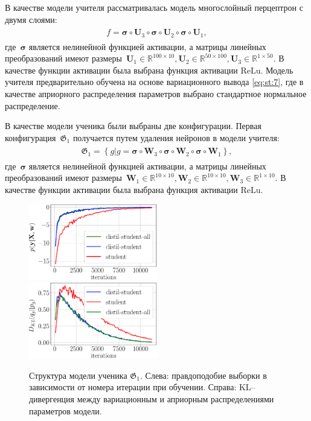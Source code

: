 \documentclass[12pt]{a&t}
\begin{document}
В качестве модели учителя рассматривалась модель многослойный перцептрон с двумя слоями:
\begin{gather}
\label{eq:ex:2}
\begin{aligned}
f = \bm{\sigma} \circ \mathbf{U}_{3} \circ  \bm{\sigma} \circ \mathbf{U}_{2} \circ \bm{\sigma} \circ \mathbf{U}_{1},
\end{aligned}
\end{gather}
где~$\bm{\sigma}$ является нелинейной функцией активации, а матрицы линейных преобразований имеют размеры~$\mathbf{U}_{1} \in \mathbb{R}^{100 \times 10}, \mathbf{U}_{2} \in \mathbb{R}^{50 \times 100},  \mathbf{U}_{3} \in \mathbb{R}^{1 \times 50}$. В качестве функции активации была выбрана функция активации $\text{ReLu}$.
Модель учителя предварительно обучена на основе вариационного вывода \eqref{eq:st:7}, где в качестве априорного распределения параметров выбрано стандартное нормальное распределение.

В качестве модели ученика были выбраны две конфигурации. Первая конфигурация~$\mathfrak{G}_1$ получается путем удаления нейронов в модели учителя:
\begin{gather}
\label{eq:ex:3}
\begin{aligned}
\mathfrak{G}_1 = \left\{g| g = \bm{\sigma} \circ \mathbf{W}_3 \circ \bm{\sigma} \circ \mathbf{W}_2 \circ \bm{\sigma} \circ \mathbf{W}_1\right\},
\end{aligned}
\end{gather}
где~$\bm{\sigma}$ является нелинейной функцией активации, а матрицы линейных преобразований имеют размеры~$\mathbf{W}_{1} \in \mathbb{R}^{10 \times 10}, \mathbf{W}_{2} \in \mathbb{R}^{10 \times 10},  \mathbf{W}_{3} \in \mathbb{R}^{1 \times 10}$. В качестве функции активации была выбрана функция активации $\text{ReLu}$.

\begin{figure}[h!]
\includegraphics[width=0.5\textwidth]{synthetic_likelihood_3_layers.eps}
\includegraphics[width=0.5\textwidth]{synthetic_D_KL_3_layers.eps}
\caption{Структура модели ученика $\mathfrak{G}_1$. Слева: правдоподобие выборки в зависимости от номера итерации при обучении. Справа: KL--дивергенция между вариационным и априорным распределениями параметров модели.}
\label{exp:fig1}
\end{figure}
\end{document}
